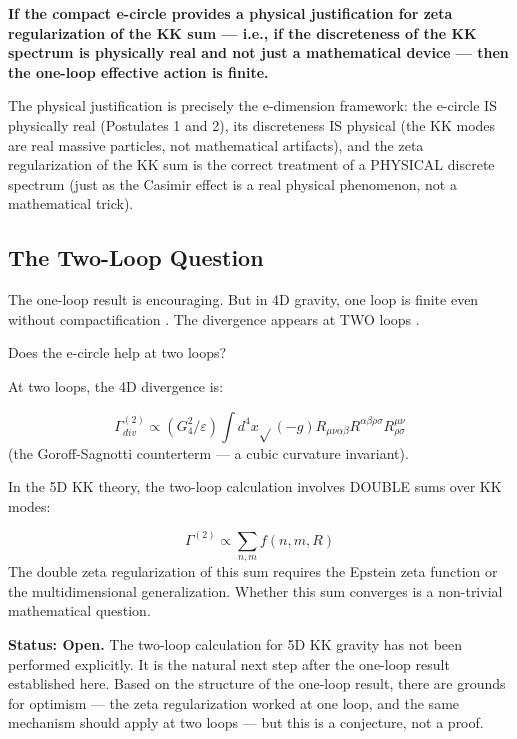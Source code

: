 \documentclass[aps,prd,preprint,superscriptaddress,longbibliography,floatfix]{revtex4-2}
\theoremstyle{remark}
\begin{document}
\textbf{If the compact e-circle provides a physical justification for zeta regularization of the KK sum --- i.e., if the discreteness of the KK spectrum is physically real and not just a mathematical device --- then the one-loop effective action is finite.}

The physical justification is precisely the e-dimension framework: the e-circle IS physically real (Postulates 1 and 2), its discreteness IS physical (the KK modes are real massive particles, not mathematical artifacts), and the zeta regularization of the KK sum is the correct treatment of a PHYSICAL discrete spectrum (just as the Casimir effect is a real physical phenomenon, not a mathematical trick).



\subsection{The Two-Loop Question}

The one-loop result is encouraging. But in 4D gravity, one loop is finite even without compactification \cite{tHooftVeltman1974}. The divergence appears at TWO loops \cite{GoroffSagnotti1986}.

Does the e-circle help at two loops?

At two loops, the 4D divergence is:


\begin{equation}
    \Gamma^{(2)}_{div} \propto (G_{4}^{2}/\varepsilon) \int d^{4}x \sqrt{}(-g) R_{\mu\nu\alpha\beta}R^{\alpha\beta\rho\sigma}R_{\rho\sigma}^{\mu\nu}
\end{equation}
(the Goroff-Sagnotti counterterm --- a cubic curvature invariant).

In the 5D KK theory, the two-loop calculation involves DOUBLE sums over KK modes:


\begin{equation}
    \Gamma^{(2)} \propto \sum_{n,m} f(n, m, R)
\end{equation}
The double zeta regularization of this sum requires the Epstein zeta function or the multidimensional generalization. Whether this sum converges is a non-trivial mathematical question.

\textbf{Status: Open.} The two-loop calculation for 5D KK gravity has not been performed explicitly. It is the natural next step after the one-loop result established here. Based on the structure of the one-loop result, there are grounds for optimism --- the zeta regularization worked at one loop, and the same mechanism should apply at two loops --- but this is a conjecture, not a proof.
\end{document}
